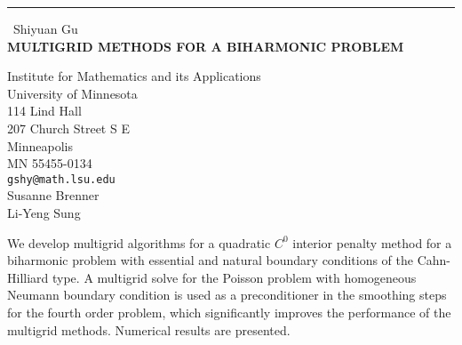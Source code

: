 \documentclass{report}
\begin{document}
\begin{center}
\rule{6in}{1pt} \
{\large Shiyuan Gu \\
{\bf MULTIGRID METHODS FOR A BIHARMONIC PROBLEM}}

Institute for Mathematics and its Applications \\ University of Minnesota \\ 114 Lind Hall \\ 207 Church Street S E \\ Minneapolis \\ MN 55455-0134
\\
{\tt gshy@math.lsu.edu}\\
Susanne Brenner\\
Li-Yeng Sung\end{center}

We develop multigrid algorithms for a quadratic $C^0$ interior penalty
method for a biharmonic problem with essential and natural boundary
conditions of the Cahn-Hilliard type. A multigrid solve for the Poisson
problem with homogeneous Neumann boundary condition is used as a
preconditioner in the smoothing steps for the fourth order problem, which
significantly improves the performance of the multigrid methods.
Numerical results are presented.
\end{document}
